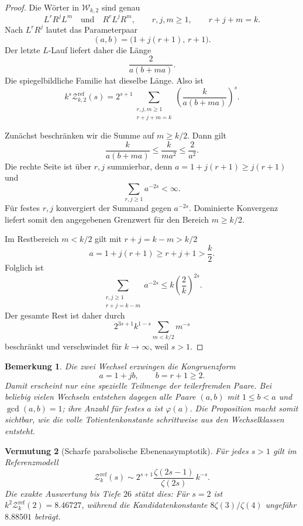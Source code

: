 \documentclass[11pt,a4paper]{article}
\newtheorem{remark}{Bemerkung}[section]
\newtheorem{conjecture}[remark]{Vermutung}
\begin{document}
\begin{proof}
Die Wörter in $\mathcal W_{k,2}$ sind genau
\[
 L^rR^jL^m
 \quad\text{und}\quad
 R^rL^jR^m,
 \qquad r,j,m\ge1,\qquad r+j+m=k.
\]
Nach $L^rR^j$ lautet das Parameterpaar
\[
 (a,b)=\bigl(1+j(r+1),\,r+1\bigr).
\]
Der letzte $L$-Lauf liefert daher die Länge
\[
 \frac{2}{a(b+ma)}.
\]
Die spiegelbildliche Familie hat dieselbe Länge. Also ist
\[
 k^s\mathcal Z_{k,2}^{\mathrm{ref}}(s)
 =
 2^{s+1}
 \sum_{\substack{r,j,m\ge1\\r+j+m=k}}
 \left(\frac{k}{a(b+ma)}\right)^s.
\]

Zunächst beschränken wir die Summe auf $m\ge k/2$. Dann gilt
\[
 \frac{k}{a(b+ma)}
 \le\frac{k}{ma^2}
 \le\frac{2}{a^2}.
\]
Die rechte Seite ist über $r,j$ summierbar, denn
$a=1+j(r+1)\ge j(r+1)$ und
\[
 \sum_{r,j\ge1}a^{-2s}<\infty.
\]
Für festes $r,j$ konvergiert der Summand gegen $a^{-2s}$.
Dominierte Konvergenz liefert somit den angegebenen Grenzwert für
den Bereich $m\ge k/2$.

Im Restbereich $m<k/2$ gilt mit $r+j=k-m>k/2$
\[
 a=1+j(r+1)\ge r+j+1>\frac{k}{2}.
\]
Folglich ist
\[
 \sum_{\substack{r,j\ge1\\r+j=k-m}}a^{-2s}
 \le k\left(\frac{2}{k}\right)^{2s}.
\]
Der gesamte Rest ist daher durch
\[
 2^{3s+1}k^{1-s}
 \sum_{m<k/2}m^{-s}
\]
beschränkt und verschwindet für $k\to\infty$, weil $s>1$.
\end{proof}

\begin{remark}
Die zwei Wechsel erzwingen die Kongruenzform
\[
 a=1+jb,\qquad b=r+1\ge2.
\]
Damit erscheint nur eine spezielle Teilmenge der teilerfremden Paare.
Bei beliebig vielen Wechseln entstehen dagegen alle Paare
$(a,b)$ mit $1\le b<a$ und $\gcd(a,b)=1$; ihre Anzahl für festes
$a$ ist $\varphi(a)$. Die Proposition macht somit sichtbar, wie die
volle Totientenkonstante schrittweise aus den Wechselklassen entsteht.
\end{remark}

\begin{conjecture}[Scharfe parabolische Ebenenasymptotik]
Für jedes $s>1$ gilt im Referenzmodell
\[
 \mathcal Z_k^{\mathrm{ref}}(s)
 \sim 2^{s+1}\frac{\zeta(2s-1)}{\zeta(2s)}\,k^{-s}.
\]
Die exakte Auswertung bis Tiefe $26$ stützt dies: Für $s=2$ ist
$k^2\mathcal Z_k^{\mathrm{ref}}(2)=8.46727$, während die
Kandidatenkonstante $8\zeta(3)/\zeta(4)$ ungefähr $8.88501$ beträgt.
\end{conjecture}
\end{document}
